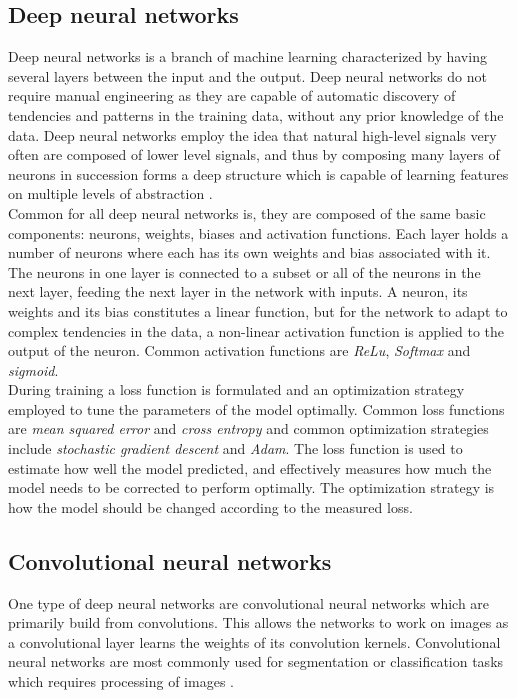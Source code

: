 \subsection{Deep neural networks}
Deep neural networks is a branch of machine learning characterized by having several layers between the input and the output. Deep neural networks do not require manual engineering as they are capable of automatic discovery of tendencies and patterns in the training data, without any prior knowledge of the data. Deep neural networks employ the idea that natural high-level signals very often are composed of lower level signals, and thus by composing many layers of neurons in succession forms a deep structure which is capable of learning features on multiple levels of abstraction \cite{lecun}.\\
Common for all deep neural networks is, they are composed of the same basic components: neurons, weights, biases and activation functions. Each layer holds a number of neurons where each has its own weights and bias associated with it. The neurons in one layer is connected to a subset or all of the neurons in the next layer, feeding the next layer in the network with inputs. A neuron, its weights and its bias constitutes a linear function, but for the network to adapt to complex tendencies in the data, a non-linear activation function is applied to the output of the neuron. Common activation functions are \textit{ReLu}, \textit{Softmax} and \textit{sigmoid}.\\
During training a loss function is formulated and an optimization strategy employed to tune the parameters of the model optimally. Common loss functions are \textit{mean squared error} and \textit{cross entropy} and common optimization strategies include \textit{stochastic gradient descent} and \textit{Adam}. The loss function is used to estimate how well the model predicted, and effectively measures how much the model needs to be corrected to perform optimally. The optimization strategy is how the model should be changed according to the measured loss.

\subsection{Convolutional neural networks}
One type of deep neural networks are convolutional neural networks which are primarily build from convolutions. This allows the networks to work on images as a convolutional layer learns the weights of its convolution kernels. Convolutional neural networks are most commonly used for segmentation or classification tasks which requires processing of images \cite{CNN}.

